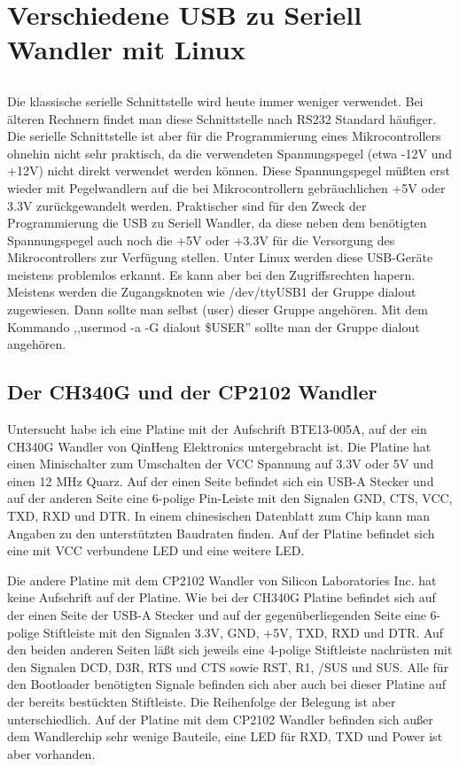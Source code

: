 \chapter{Verschiedene USB zu Seriell Wandler mit Linux}

\section*{}
Die klassische serielle Schnittstelle wird heute immer weniger verwendet.
Bei älteren Rechnern findet man diese Schnittstelle nach RS232 Standard häufiger.
Die serielle Schnittstelle ist aber für die Programmierung eines Mikrocontrollers
ohnehin nicht sehr praktisch, da die verwendeten Spannungspegel (etwa -12V und +12V)
nicht direkt verwendet werden können. Diese Spannungspegel müßten erst
wieder mit Pegelwandlern auf die bei Mikrocontrollern gebräuchlichen +5V oder 3.3V
zurückgewandelt werden.
Praktischer sind für den Zweck der Programmierung die USB zu Seriell Wandler,
da diese neben dem benötigten Spannungspegel auch noch die +5V oder +3.3V für
die Versorgung des Mikrocontrollers zur Verfügung stellen.
Unter Linux werden diese USB-Geräte meistens problemlos erkannt.
Es kann aber bei den Zugriffsrechten hapern.
Meistens werden die Zugangsknoten wie /dev/ttyUSB1 der Gruppe dialout zugewiesen.
Dann sollte man selbst (user) dieser Gruppe angehören.
Mit dem Kommando ,,usermod -a -G dialout \$USER'' sollte man der
Gruppe dialout angehören.


\section{Der CH340G und der CP2102 Wandler }
Untersucht habe ich eine Platine mit der Aufschrift BTE13-005A,
auf der ein CH340G Wandler von QinHeng Elektronics untergebracht ist. Die Platine hat einen Minischalter
zum Umschalten der VCC Spannung auf 3.3V oder 5V und einen 12 MHz Quarz.
Auf der einen Seite befindet sich ein USB-A Stecker und auf der anderen Seite
eine 6-polige Pin-Leiste mit den Signalen GND, CTS, VCC, TXD, RXD und DTR.
In einem chinesischen Datenblatt zum Chip kann man Angaben zu den unterstützten Baudraten finden.
Auf der Platine befindet sich eine mit VCC verbundene LED und eine weitere LED.

Die andere Platine mit dem CP2102 Wandler von Silicon Laboratories Inc. hat keine Aufschrift auf der Platine. 
Wie bei der CH340G Platine befindet sich auf der einen Seite der USB-A Stecker und auf
der gegenüberliegenden Seite eine 6-polige Stiftleiste mit den Signalen
3.3V, GND, +5V, TXD, RXD und DTR. Auf den beiden anderen Seiten läßt sich jeweils
eine 4-polige Stiftleiste nachrüsten mit den Signalen DCD, D3R, RTS und CTS
sowie RST, R1, /SUS und SUS. Alle für den Bootloader benötigten Signale befinden sich aber
auch bei dieser Platine auf der bereits bestückten Stiftleiste. 
Die Reihenfolge der Belegung ist aber unterschiedlich.
Auf der Platine mit dem CP2102 Wandler befinden sich außer dem Wandlerchip sehr wenige Bauteile,
eine LED für RXD, TXD und Power ist aber vorhanden.

